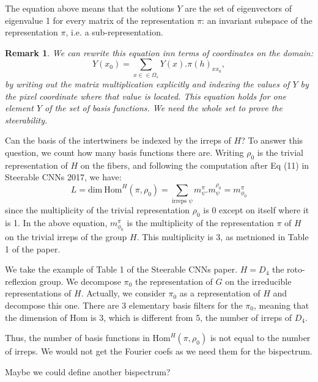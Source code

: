 \documentclass{article}
\newtheorem{remark}{Remark}
\begin{document}
The equation above means that the solutions $Y$ are the set of eigenvectors of eigenvalue 1 for every matrix of the representation $\pi$: an invariant subspace of the representation $\pi$, i.e. a sub-representation.


\begin{remark}
    We can rewrite this equation inn terms of coordinates on the domain:
\begin{equation}
    Y(x_0) = \sum_{x \in \in \Omega_s} Y(x).\pi(h)_{xx_0},
\end{equation}
by writing out the matrix multiplication explicitly and indexing the values of $Y$ by the pixel coordinate where that value is located. This equation holds for one element $Y$ of the set of basis functions. We need the whole set to prove the steerability.
\end{remark}

Can the basis of the intertwiners be indexed by the irreps of $H$? To answer this question, we count how many basis functions there are. Writing $\rho_0$ is the trivial representation of $H$ on the fibers, and following the computation after Eq (11) in Steerable CNNs 2017, we have:
\begin{equation}
    L = \text{dim}~\text{Hom}^H(\pi, \rho_0) = \sum_{\text{irreps }\psi } m^\pi_{\psi}.m^{\rho_0}_{\psi} = m^\pi_{\phi_0}
\end{equation}
since the multiplicity of the trivial representation $\rho_0$ is 0 except on itself where it is 1. In the above equation, $m^\pi_{\phi_0}$ is the multiplicity of the representation $\pi$ of $H$ on the trivial irreps of the group $H$. This multiplicity is $3$, as metnioned in Table 1 of the paper.

We take the example of Table 1 of the Steerable CNNs paper. $H = D_4$ the roto-reflexion group. We decompose $\pi_0$ the representation of $G$ on the irreducible representations of $H$. Actually, we consider $\pi_0$ as a representation of $H$ and decompose this one. There are 3 elementary basis filters for the $\pi_0$, meaning that the dimension of Hom is 3, which is different from 5, the number of irreps of $D_4$.

Thus, the number of basis functions in $\text{Hom}^H(\pi, \rho_0)$ is not equal to the number of irreps. We would not get the Fourier coefs as we need them for the bispectrum.

Maybe we could define another bispectrum?
\end{document}
